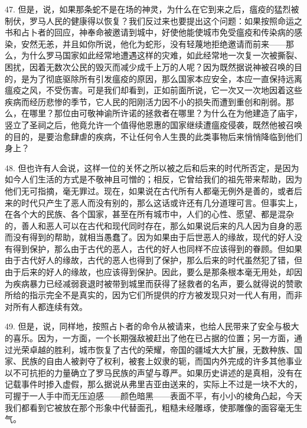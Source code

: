 47. 但是，说，如果那条蛇不是在场的神灵，为什么在它到来之后，瘟疫的猛烈被制伏，罗马人民的健康得以恢复？我们反过来也要提出这个问题：如果按照命运之书和占卜者的回应，神奉命被邀请到城中，好使他能使城市免受瘟疫和传染病的感染，安然无恙，并且如你所说，他化为蛇形，没有轻蔑地拒绝邀请而前来——那么，为什么罗马国家如此经常地遭遇这样的灾难，如此经常地一次复一次被撕裂、困扰，因着无数次公民的毁灭而减少成千上万的人呢？因为既然据说神被召唤的目的，是为了彻底驱除所有引发瘟疫的原因，那么国家本应安全，本应一直保持远离瘟疫之风，不受伤害。可是我们却看到，正如前面所说，它一次又一次地因着这些疾病而经历悲惨的季节，它人民的阳刚活力因不小的损失而遭到重创和削弱。那么，在哪里？那位由可敬神谕所许诺的拯救者在哪里？为什么在为他建造了庙宇，竖立了圣祠之后，他竟允许一个值得他恩惠的国家继续遭瘟疫侵袭，既然他被召唤的目的，是要治愈肆虐的疾病，不让任何令人生畏的此类事物后来悄悄降临到他们身上？\par

48. 但也许有人会说，这样一位的关怀之所以被之后和后来的时代所否定，是因为如今人们生活的方式是不敬神且可憎的；相反，它曾给我们的祖先带来帮助，因为他们无可指摘，毫无罪过。现在，如果说在古代所有人都毫无例外是善的，或者后来的时代只产生了恶人而没有别的，那么这话或许还有几分道理可言。但事实上，在各个大的民族、各个国家，甚至在所有城市中，人们的心性、愿望、都是混杂的，善人和恶人可以在古代和现代同时存在，那么如果说后来的凡人因为自身的恶而没有得到的帮助，就相当愚蠢了。因为如果由于后世恶人的缘故，现代的好人没有得到保护，那么由于古代的恶人，古代的好人也同样不应该得到的眷顾。但如果由于古代好人的缘故，古代的恶人也得到了保护，那么后来的时代虽然犯了错，但由于后来的好人的缘故，也应该得到保护。因此，要么是那条根本毫无用处，却因为疾病暴力已经减弱衰退时被带到城里而获得了拯救者的名声，要么就得说的赞歌所给的指示完全不是真实的，因为它们所提供的疗方被发现只对一代人有用，而非对所有人都连续有效。\par

49. 但是，说，同样地，按照占卜者的命令从被请来，也给人民带来了安全与极大的喜乐。因为，一方面，一个长期强敌被赶出了他在已占据的位置；另一方面，通过光荣卓越的胜利，城市恢复了古代的荣耀，帝国的疆域大大扩展，无数种族、国家、民族的自由人被剥夺了权利，被套上奴隶的轭，而国内外完成的许多其他事业以不可抗拒的力量确立了罗马民族的声望与尊严。如果历史讲述的是真相，没有在记载事件时掺入虚假，那么据说从弗里吉亚由送来的，实际上不过是一块不大的，可握于一人手中而无压迫感——颜色暗黑——表面不平，有小小的棱角凸起，今天我们都看到它被放在那个形象中代替面孔，粗糙未经雕琢，使那雕像的面容毫无生气。\par

